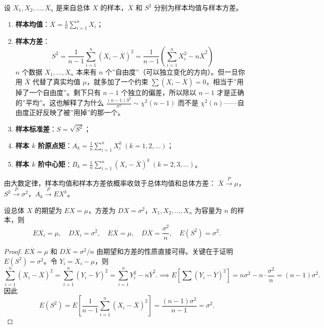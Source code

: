 \documentclass[lang=cn,11pt]{elegantbook}
\begin{document}
\begin{definition}[常用统计量] \label{def:common-stat}
设 \(X_1, X_2, \dots, X_n\) 是来自总体 \(X\) 的样本，\(\overline{X}\) 和 \(S^2\) 分别为样本均值与样本方差。
\begin{enumerate}
    \item \textbf{样本均值}：\(\displaystyle\overline{X} = \frac{1}{n}\sum_{i=1}^{n}X_i\)；
    \item \textbf{样本方差}：\[\displaystyle S^2 = \frac{1}{n-1}\sum_{i=1}^{n}(X_i - \overline{X})^2 = \frac{1}{n-1}\!\left(\sum_{i=1}^{n}X_i^2 - n\overline{X}^2\right)\]$n$ 个数据 $X_1,\dots,X_n$ 本来有 $n$ 个”自由度”（可以独立变化的方向）。但一旦你用 $\bar{X}$ 代替了真实均值 $\mu$，就多加了一个约束 $\sum(X_i-\bar{X})=0$，相当于”用掉了一个自由度”。剩下只有 $n-1$ 个独立的偏差，所以除以 $n-1$ 才是正确的”平均”。这也解释了为什么 $\frac{(n-1)S^2}{\sigma^2}\sim\chi^2(n-1)$ 而不是 $\chi^2(n)$——自由度正好反映了被”用掉”的那一个。
    \item \textbf{样本标准差}：\(S = \sqrt{S^2}\)；
    \item \textbf{样本 \(k\) 阶原点矩}：\(\displaystyle A_k = \frac{1}{n}\sum_{i=1}^{n}X_i^k\ (k=1,2,\dots)\)；
    \item \textbf{样本 \(k\) 阶中心矩}：\(\displaystyle B_k = \frac{1}{n}\sum_{i=1}^{n}(X_i - \overline{X})^k\ (k=2,3,\dots)\)。
\end{enumerate}
由大数定律，样本均值和样本方差依概率收敛于总体均值和总体方差：
\(\overline{X} \stackrel{P}{\longrightarrow} \mu\)，\(S^2 \stackrel{P}{\longrightarrow} \sigma^2\)，\(A_k \stackrel{P}{\longrightarrow} EX^k\)。
\end{definition}

\begin{property}[统计量的数字特征] \label{prop:stat-moment}
设总体 \(X\) 的期望为 \(EX = \mu\)，方差为 \(DX = \sigma^2\)，\(X_1, X_2, \dots, X_n\) 为容量为 \(n\) 的样本，则
\[
EX_i = \mu,\quad DX_i = \sigma^2,\quad E\overline{X} = \mu,\quad D\overline{X} = \frac{\sigma^2}{n},\quad E(S^2) = \sigma^2.
\]
\end{property}
\begin{proof}
\(E\overline{X} = \mu\) 和 \(D\overline{X} = \sigma^2/n\) 由期望和方差的性质直接可得。关键在于证明 \(E(S^2) = \sigma^2\)。令 \(Y_i = X_i - \mu\)，则
\[
\sum_{i=1}^{n}(X_i - \overline{X})^2 = \sum_{i=1}^{n}(Y_i - \overline{Y})^2 = \sum_{i=1}^{n} Y_i^2 - n\overline{Y}^2.
\implies
E\!\left[\sum(Y_i - \overline{Y})^2\right] = n\sigma^2 - n\cdot\frac{\sigma^2}{n} = (n-1)\sigma^2.
\]
因此
\[
E(S^2) = E\!\left[\frac{1}{n-1}\sum_{i=1}^{n}(X_i-\overline{X})^2\right] = \frac{(n-1)\sigma^2}{n-1} = \sigma^2.
\]
\end{proof}
\end{document}
